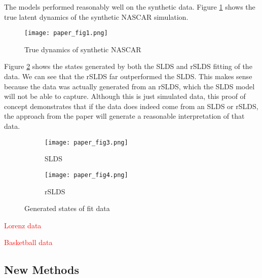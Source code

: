 The models performed reasonably well on the synthetic data. Figure \ref{trueNascar} shows the true latent dynamics of the synthetic NASCAR simulation.
\begin{figure}[h!]
	\centering
	\texttt{[image: paper\_fig1.png]}
	\caption{True dynamics of synthetic NASCAR}
	\label{trueNascar}
\end{figure}

Figure \ref{Nascargen} shows the states generated by both the SLDS and rSLDS fitting of the data. We can see that the rSLDS far outperformed the SLDS. This makes sense because the data was actually generated from an rSLDS, which the SLDS model will not be able to capture. Although this is just simulated data, this proof of concept demonstrates that if the data does indeed come from an SLDS or rSLDS, the approach from the paper will generate a reasonable interpretation of that data.

\begin{figure}[h!]
	\centering
	\begin{subfigure}[b]{0.35\textwidth}
		\texttt{[image: paper\_fig3.png]}
		\caption{SLDS}
	\end{subfigure}
	\begin{subfigure}[b]{0.35\textwidth}
		\texttt{[image: paper\_fig4.png]}
		\caption{rSLDS}
	\end{subfigure}
	\caption{Generated states of fit data}
	\label{Nascargen}
\end{figure}

\textcolor{red}{Lorenz data}

\textcolor{red}{Basketball data}

\subsection{New Methods}